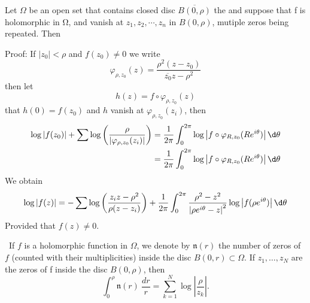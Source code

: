 \documentclass[12pt, oneside]{book}
\begin{document}
\begin{theorem}
    Let $\Omega$ be an open set that contains closed disc $\overline{B(0, \rho)}$ the
    and suppose that f is holomorphic in Ω, and vanish at $z_1,z_2,\cdots,z_n$ in $B(0,\rho)$, mutiple zeros being repeated. Then

    Proof:
    If $\left|z_0\right|< \rho $ and $f(z_0)\neq 0$ we write
    $$
        \varphi_{\rho,z_0}(z)=\frac{\rho^2(z-z_0)}{\overline{z_0}z-\rho^2}
    $$
    then let
    $$h(z)=f\circ\varphi_{\rho,z_0}(z)$$
    that $h(0)=f(z_0)$ and $h$ vanish at $\varphi_{\rho,z_0}(z_i)$, then
    $$\begin{aligned}
            \log \left|f(z_0)\right|+\sum\log\left(\frac{\rho}{\left|\varphi_{\rho,z_0}(z_i)\right|}\right)
             & = \frac1{2\pi}\int_0^{2\pi}\log\left|f\circ\varphi_{R,z_0}(Re^{i\theta})\right|\d \theta \\
             & =\frac1{2\pi}\int_0^{2\pi}\log\left|f\circ\varphi_{R,z_0}(Re^{i\theta})\right|\d \theta
        \end{aligned} $$
    We obtain
    $$\log \left|f(z)\right|=-\sum\log\left(\frac{z_iz-\rho^2}{\rho(z-z_i)}\right)
        +
        \frac1{2\pi}\int_0^{2\pi}\frac{\rho^2-z^2}{\left|\rho e^{i\theta}-z\right|^2}\log\left|f(\rho e^{i\theta})\right|\d \theta$$
    Provided that $f(z)\neq 0$.

\end{theorem}
\begin{lemma}\
    If $f$ is a holomorphic function in $\Omega$, we denote by $\mathfrak{n}(r)$  the number of zeros of $f$ (counted with their multiplicities) inside the disc $B(0,r) \subset \Omega$. If $z_1,\ldots,z_N$ are the zeros of f inside the disc $B(0,\rho)$, then
    $$\int_0^\rho \mathfrak{n}(r)\:\frac{dr}r=\sum_{k=1}^N\log\left|\frac \rho {z_k}\right|.$$
\end{lemma}
\end{document}
